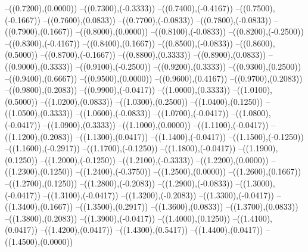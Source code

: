 {	--({\sx*(0.7200)},{\sy*(0.0000)})
	--({\sx*(0.7300)},{\sy*(-0.3333)})
	--({\sx*(0.7400)},{\sy*(-0.4167)})
	--({\sx*(0.7500)},{\sy*(-0.1667)})
	--({\sx*(0.7600)},{\sy*(0.0833)})
	--({\sx*(0.7700)},{\sy*(-0.0833)})
	--({\sx*(0.7800)},{\sy*(-0.0833)})
	--({\sx*(0.7900)},{\sy*(0.1667)})
	--({\sx*(0.8000)},{\sy*(0.0000)})
	--({\sx*(0.8100)},{\sy*(-0.0833)})
	--({\sx*(0.8200)},{\sy*(-0.2500)})
	--({\sx*(0.8300)},{\sy*(-0.4167)})
	--({\sx*(0.8400)},{\sy*(0.1667)})
	--({\sx*(0.8500)},{\sy*(-0.0833)})
	--({\sx*(0.8600)},{\sy*(0.5000)})
	--({\sx*(0.8700)},{\sy*(-0.1667)})
	--({\sx*(0.8800)},{\sy*(0.3333)})
	--({\sx*(0.8900)},{\sy*(0.0833)})
	--({\sx*(0.9000)},{\sy*(0.3333)})
	--({\sx*(0.9100)},{\sy*(-0.2500)})
	--({\sx*(0.9200)},{\sy*(0.3333)})
	--({\sx*(0.9300)},{\sy*(0.2500)})
	--({\sx*(0.9400)},{\sy*(0.6667)})
	--({\sx*(0.9500)},{\sy*(0.0000)})
	--({\sx*(0.9600)},{\sy*(0.4167)})
	--({\sx*(0.9700)},{\sy*(0.2083)})
	--({\sx*(0.9800)},{\sy*(0.2083)})
	--({\sx*(0.9900)},{\sy*(-0.0417)})
	--({\sx*(1.0000)},{\sy*(0.3333)})
	--({\sx*(1.0100)},{\sy*(0.5000)})
	--({\sx*(1.0200)},{\sy*(0.0833)})
	--({\sx*(1.0300)},{\sy*(0.2500)})
	--({\sx*(1.0400)},{\sy*(0.1250)})
	--({\sx*(1.0500)},{\sy*(0.3333)})
	--({\sx*(1.0600)},{\sy*(-0.0833)})
	--({\sx*(1.0700)},{\sy*(-0.0417)})
	--({\sx*(1.0800)},{\sy*(-0.0417)})
	--({\sx*(1.0900)},{\sy*(0.3333)})
	--({\sx*(1.1000)},{\sy*(0.0000)})
	--({\sx*(1.1100)},{\sy*(-0.0417)})
	--({\sx*(1.1200)},{\sy*(0.2083)})
	--({\sx*(1.1300)},{\sy*(0.0417)})
	--({\sx*(1.1400)},{\sy*(-0.0417)})
	--({\sx*(1.1500)},{\sy*(-0.1250)})
	--({\sx*(1.1600)},{\sy*(-0.2917)})
	--({\sx*(1.1700)},{\sy*(-0.1250)})
	--({\sx*(1.1800)},{\sy*(-0.0417)})
	--({\sx*(1.1900)},{\sy*(0.1250)})
	--({\sx*(1.2000)},{\sy*(-0.1250)})
	--({\sx*(1.2100)},{\sy*(-0.3333)})
	--({\sx*(1.2200)},{\sy*(0.0000)})
	--({\sx*(1.2300)},{\sy*(0.1250)})
	--({\sx*(1.2400)},{\sy*(-0.3750)})
	--({\sx*(1.2500)},{\sy*(0.0000)})
	--({\sx*(1.2600)},{\sy*(0.1667)})
	--({\sx*(1.2700)},{\sy*(0.1250)})
	--({\sx*(1.2800)},{\sy*(-0.2083)})
	--({\sx*(1.2900)},{\sy*(-0.0833)})
	--({\sx*(1.3000)},{\sy*(-0.0417)})
	--({\sx*(1.3100)},{\sy*(-0.0417)})
	--({\sx*(1.3200)},{\sy*(-0.2083)})
	--({\sx*(1.3300)},{\sy*(-0.0417)})
	--({\sx*(1.3400)},{\sy*(0.1667)})
	--({\sx*(1.3500)},{\sy*(0.2917)})
	--({\sx*(1.3600)},{\sy*(0.0833)})
	--({\sx*(1.3700)},{\sy*(0.0833)})
	--({\sx*(1.3800)},{\sy*(0.2083)})
	--({\sx*(1.3900)},{\sy*(-0.0417)})
	--({\sx*(1.4000)},{\sy*(0.1250)})
	--({\sx*(1.4100)},{\sy*(0.0417)})
	--({\sx*(1.4200)},{\sy*(0.0417)})
	--({\sx*(1.4300)},{\sy*(0.5417)})
	--({\sx*(1.4400)},{\sy*(0.0417)})
	--({\sx*(1.4500)},{\sy*(0.0000)})
}
